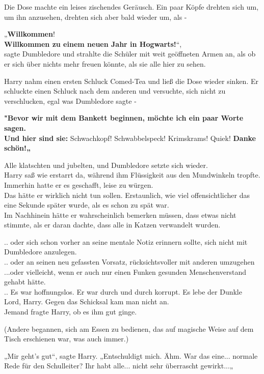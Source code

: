 {Die Dose machte ein leises zischendes Geräusch. Ein paar Köpfe drehten sich um, um ihn anzusehen, drehten sich aber bald wieder um, als -

„\textbf{Willkommen}!\\ \textbf{Willkommen zu einem neuen Jahr in Hogwarts!}“,\\ sagte Dumbledore und strahlte die Schüler mit weit geöffneten Armen an, als ob er sich über nichts mehr freuen könnte, als sie alle hier zu sehen.

Harry nahm einen ersten Schluck Comed-Tea und ließ die Dose wieder sinken. Er schluckte einen Schluck nach dem anderen und versuchte, sich nicht zu verschlucken, egal was Dumbledore sagte -

\textbf{"Bevor wir mit dem Bankett beginnen, möchte ich ein paar Worte sagen.\\ Und hier sind sie:} Schwachkopf! Schwabbelspeck! Krimskrams! Quiek! \textbf{Danke schön!„}

Alle klatschten und jubelten, und Dumbledore setzte sich wieder.\\ Harry saß wie erstarrt da, während ihm Flüssigkeit aus den Mundwinkeln tropfte. Immerhin hatte er es geschafft, leise zu würgen.\\ Das hätte er wirklich nicht tun sollen. Erstaunlich, wie viel offensichtlicher das eine Sekunde später wurde, als es schon zu spät war.\\ Im Nachhinein hätte er wahrscheinlich bemerken müssen, dass etwas nicht stimmte, als er daran dachte, dass alle in Katzen verwandelt wurden.

.. oder sich schon vorher an seine mentale Notiz erinnern sollte, sich nicht mit Dumbledore anzulegen.\\ .. oder an seinen neu gefassten Vorsatz, rücksichtsvoller mit anderen umzugehen\\ ...oder vielleicht, wenn er auch nur einen Funken gesunden Menschenverstand gehabt hätte.\\ .. Es war hoffnungslos. Er war durch und durch korrupt. Es lebe der Dunkle Lord, Harry. Gegen das Schicksal kam man nicht an.\\ Jemand fragte Harry, ob es ihm gut ginge.

(Andere begannen, sich am Essen zu bedienen, das auf magische Weise auf dem Tisch erschienen war, was auch immer.)

„Mir geht's gut“, sagte Harry. „Entschuldigt mich. Ähm. War das eine... normale Rede für den Schulleiter? Ihr habt alle... nicht sehr überrascht gewirkt...„

}
